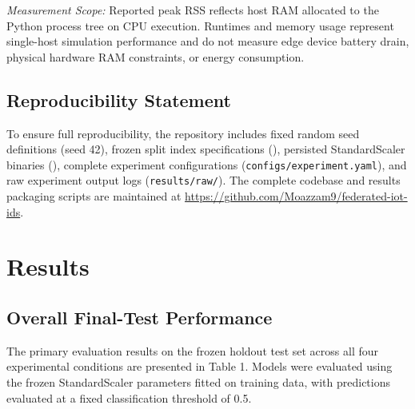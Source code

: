 \documentclass[11pt,a4paper]{article}
\begin{document}
\textit{Measurement Scope:} Reported peak RSS reflects host RAM allocated to the Python process tree on CPU execution. Runtimes and memory usage represent single-host simulation performance and do not measure edge device battery drain, physical hardware RAM constraints, or energy consumption.

\subsection{Reproducibility Statement}
To ensure full reproducibility, the repository includes fixed random seed definitions (seed 42), frozen split index specifications (\texttt{}), persisted StandardScaler binaries (\texttt{}), complete experiment configurations (\texttt{configs/experiment.yaml}), and raw experiment output logs (\texttt{results/raw/}). The complete codebase and results packaging scripts are maintained at \url{https://github.com/Moazzam9/federated-iot-ids}.

\section{Results}

\subsection{Overall Final-Test Performance}
The primary evaluation results on the frozen holdout test set across all four experimental conditions are presented in Table 1. Models were evaluated using the frozen StandardScaler parameters fitted on training data, with predictions evaluated at a fixed classification threshold of 0.5.
\end{document}

